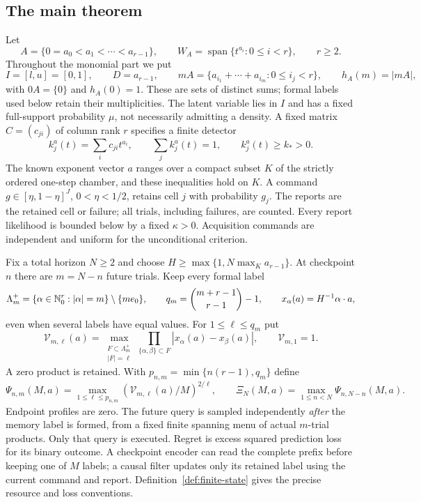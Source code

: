 \subsection{The main theorem}
Let
\[
 A=\{0=a_0<a_1<\cdots<a_{r-1}\},\qquad
 W_A=\operatorname{span}\{t^{a_i}:0\le i<r\},\qquad r\ge2.
\]
Throughout the monomial part we put
\[
 I=[l,u]=[0,1],\qquad D=a_{r-1},\qquad
 mA=\{a_{i_1}+\cdots+a_{i_m}:0\le i_j<r\},\qquad h_A(m)=|mA|,
\]
with $0A=\{0\}$ and $h_A(0)=1$. These are sets of distinct sums;
formal labels used below retain their multiplicities.
The latent variable lies in $I$ and has a fixed full-support
probability $\mu$, not necessarily admitting a density. A fixed matrix
$C=(c_{ji})$ of column rank $r$ specifies a finite detector
\[
 k_j^a(t)=\sum_i c_{ji}t^{a_i},\qquad
 \sum_j k_j^a(t)=1,\qquad k_j^a(t)\ge k_*>0.
\]
The known exponent vector $a$ ranges over a compact subset $K$ of the
strictly ordered one-step chamber, and these inequalities hold on $K$.
A command $g\in[\eta,1-\eta]^J$, $0<\eta<1/2$, retains cell $j$
with probability $g_j$. The reports are the retained cell or failure;
all trials, including failures, are counted. Every report likelihood is
bounded below by a fixed $\kappa>0$. Acquisition commands are independent
and uniform for the unconditional criterion.

Fix a total horizon $N\ge2$ and choose
$H\ge\max\{1,N\max_K a_{r-1}\}$. At checkpoint $n$ there are
$m=N-n$ future trials. Keep every formal label
\[
 \Lambda_m^+=\{\alpha\in\mathbb N_0^r:|\alpha|=m\}\setminus\{me_0\},
 \qquad q_m=\binom{m+r-1}{r-1}-1,
 \qquad x_\alpha(a)=H^{-1}\alpha\cdot a,
\]
even when several labels have equal values. For $1\le\ell\le q_m$ put
\[
 \mathcal V_{m,\ell}(a)=\max_{\substack{F\subset\Lambda_m^+\\|F|=\ell}}
     \prod_{\{\alpha,\beta\}\subset F}|x_\alpha(a)-x_\beta(a)|,
 \qquad \mathcal V_{m,1}=1.
\]
A zero product is retained. With $p_{n,m}=\min\{n(r-1),q_m\}$ define
\[
 \Psi_{n,m}(M,a)=\max_{1\le\ell\le p_{n,m}}
       (\mathcal V_{m,\ell}(a)/M)^{2/\ell},\qquad
 \Xi_N(M,a)=\max_{1\le n<N}\Psi_{n,N-n}(M,a).
\]
Endpoint profiles are zero. The future query is sampled independently
\emph{after} the memory label is formed, from a fixed finite spanning
menu of actual $m$-trial products. Only that query is executed. Regret
is excess squared prediction loss for its binary outcome. A checkpoint
encoder can read the complete prefix before keeping one of $M$ labels;
a causal filter updates only its retained label using the current
command and report. Definition~\ref{def:finite-state} gives the precise
resource and loss conventions.

